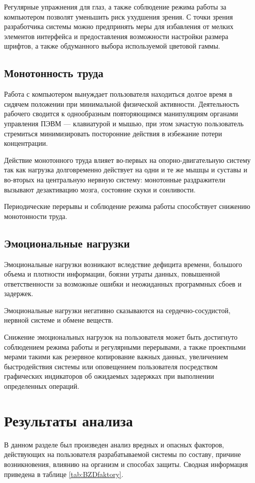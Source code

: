 \documentclass[14pt,oneside,final]{extreport}
\begin{document}
	Регулярные упражнения для глаз, а также соблюдение режима работы за компьютером позволят уменьшить риск ухудшения зрения. С точки зрения разработчика системы можно предпринять меры для избавления от мелких элементов интерфейса и предоставления возможности настройки размера шрифтов, а также обдуманного выбора используемой цветовой гаммы. 
	\subsection{Монотонность труда}
	Работа с компьютером вынуждает пользователя находиться долгое время в сидячем положении при минимальной физической активности. Деятельность рабочего сводится к однообразным повторяющимся манипуляциям органами управления  ПЭВМ --- клавиатурой и мышью, при этом зачастую пользователь стремиться минимизировать посторонние действия в избежание потери концентрации. 

	Действие монотонного труда влияет во-первых на опорно-двигательную систему так как нагрузка долговременно действует на одни и те же мышцы и суставы  и во-вторых на центральную нервную систему: монотонные раздражители вызывают дезактивацию мозга, состояние скуки и сонливости.   
	
	Периодические перерывы и соблюдение режима работы способствует снижению монотонности труда.
	
	\subsection{Эмоциональные нагрузки}
	Эмоциональные нагрузки возникают вследствие дефицита времени, большого объема и плотности информации, боязни утраты данных, повышенной ответственности за возможные ошибки и неожиданных программных сбоев и задержек.  
	
	Эмоциональные нагрузки негативно сказываются на сердечно-сосудистой, нервной системе и обмене веществ. 
	
	Снижение эмоциональных нагрузок на пользователя может быть достигнуто соблюдением режима работы и регулярными перерывами, а также проектными мерами такими как резервное копирование важных данных, увеличением быстродействия системы или оповещением пользователя посредством графических индикаторов об ожидаемых задержках при выполнении определенных операций.
	\section{Результаты анализа}
	В данном разделе был произведен анализ вредных и опасных факторов, действующих на пользователя разрабатываемой системы по составу, причине возникновения, влиянию на организм и способах защиты. Сводная информация приведена в таблице \ref{tab:BZDfaktory}.
\end{document}
